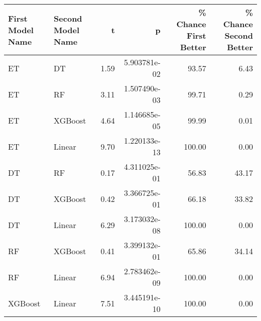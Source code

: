 \begin{tabular}{llrrrr}
\toprule
First Model Name & Second Model Name &    t &            p &  \% Chance First Better &  \% Chance Second Better \\
\midrule
              ET &                DT & 1.59 & 5.903781e-02 &                  93.57 &                    6.43 \\
              ET &                RF & 3.11 & 1.507490e-03 &                  99.71 &                    0.29 \\
              ET &           XGBoost & 4.64 & 1.146685e-05 &                  99.99 &                    0.01 \\
              ET &            Linear & 9.70 & 1.220133e-13 &                 100.00 &                    0.00 \\
              DT &                RF & 0.17 & 4.311025e-01 &                  56.83 &                   43.17 \\
              DT &           XGBoost & 0.42 & 3.366725e-01 &                  66.18 &                   33.82 \\
              DT &            Linear & 6.29 & 3.173032e-08 &                 100.00 &                    0.00 \\
              RF &           XGBoost & 0.41 & 3.399132e-01 &                  65.86 &                   34.14 \\
              RF &            Linear & 6.94 & 2.783462e-09 &                 100.00 &                    0.00 \\
         XGBoost &            Linear & 7.51 & 3.445191e-10 &                 100.00 &                    0.00 \\
\bottomrule
\end{tabular}

